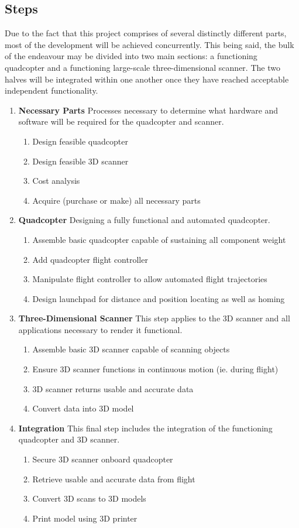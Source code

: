 \documentclass[10pt,letterpaper]{article}
\begin{document}
\subsection{Steps}
Due to the fact that this project comprises of several distinctly different parts, most of the development will be achieved concurrently. This being said, the bulk of the endeavour may be divided into two main sections: a functioning quadcopter and a functioning large-scale three-dimensional scanner. The two halves will be integrated within one another once they have reached acceptable independent functionality. 
\begin{enumerate}
	\item \textbf{Necessary Parts} Processes necessary to determine what hardware and software will be required for the quadcopter and scanner. 
	\begin{enumerate}
		\item Design feasible quadcopter
		\item Design feasible 3D scanner
		\item Cost analysis 
		\item Acquire (purchase or make) all necessary parts
	\end{enumerate}
	\item \textbf{Quadcopter} Designing a fully functional and automated quadcopter.
	\begin{enumerate}
		\item Assemble basic quadcopter capable of sustaining all component weight
		\item Add quadcopter flight controller
		\item Manipulate flight controller to allow automated flight trajectories
		\item Design launchpad for distance and position locating as well as homing
	\end{enumerate}
	\item \textbf{Three-Dimensional Scanner} This step applies to the 3D scanner and all applications necessary to render it functional.
	\begin{enumerate}
		\item Assemble basic 3D scanner capable of scanning objects
		\item Ensure 3D scanner functions in continuous motion (ie. during flight)
		\item 3D scanner returns usable and accurate data
		\item Convert data into 3D model
	\end{enumerate}
	\item \textbf{Integration} This final step includes the integration of the functioning quadcopter and 3D scanner.
	\begin{enumerate}
		\item Secure 3D scanner onboard quadcopter
		\item Retrieve usable and accurate data from flight
		\item Convert 3D scans to 3D models
		\item Print model using 3D printer
	\end{enumerate}
\end{enumerate}
\end{document}
